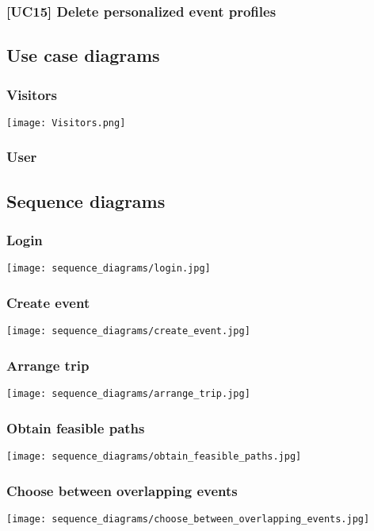 	\subsubsection{[UC15] Delete personalized event profiles}
		
		
\subsection{Use case diagrams}
\label{subsect:Use case diagrams}
	\subsubsection{Visitors}
		\texttt{[image: Visitors.png]}
	\subsubsection{User}
		\noindent{}
		
\subsection{Sequence diagrams}
\label{subsect:Sequence diagrams}
	\subsubsection{Login}
		\texttt{[image: sequence\_diagrams/login.jpg]}
	\subsubsection{Create event}
		\texttt{[image: sequence\_diagrams/create\_event.jpg]}
	\subsubsection{Arrange trip}
		\texttt{[image: sequence\_diagrams/arrange\_trip.jpg]}
	\subsubsection{Obtain feasible paths}
		\texttt{[image: sequence\_diagrams/obtain\_feasible\_paths.jpg]}
	\subsubsection{Choose between overlapping events}
		\texttt{[image: sequence\_diagrams/choose\_between\_overlapping\_events.jpg]}